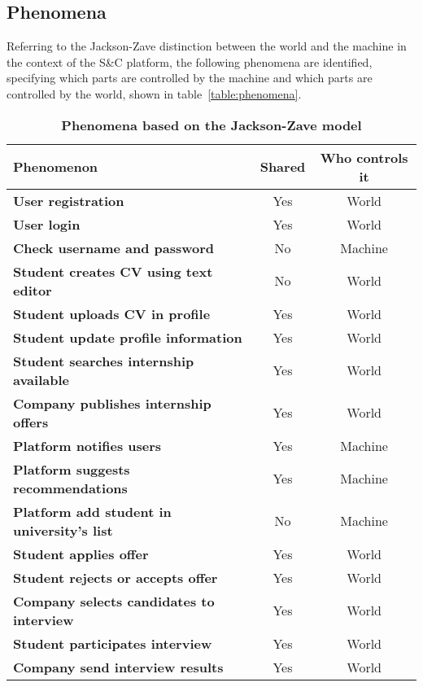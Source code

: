 \subsection{Phenomena}
Referring to the Jackson-Zave distinction between the world and the machine in the context of the S\&C platform, the following phenomena are 
identified, specifying which parts are controlled by the machine and which parts are controlled by the world, shown in table~\ref{table:phenomena}.

\begin{table}[H]
    \caption*{\textbf{Phenomena based on the Jackson-Zave model}}
    \centering 
    \begin{tabular}{|p{20em}|c|c|}
    \hline
    \rowcolor{bluepoli!40} %
    \textbf{Phenomenon} & \textbf{Shared} & \textbf{Who controls it} \T\B \\
    \hline
    \textbf{User registration} & Yes & World \T\B \\
    \textbf{User login} & Yes & World \T\B\\
    \textbf{Check username and password} & No & Machine \T\B\\
    \textbf{Student creates CV using text editor} & No & World  \T\B \\
    \textbf{Student uploads CV in profile} & Yes & World  \T\B \\
    \textbf{Student update profile information} & Yes & World  \T\B \\
    \textbf{Student searches internship available} & Yes & World \T\B\\
    \textbf{Company publishes internship offers} & Yes & World \T\B \\
    \textbf{Platform notifies users} & Yes & Machine \B\\
    \textbf{Platform suggests recommendations} & Yes & Machine \T\B \\
    \textbf{Platform add student in university's list} & No & Machine \T\B \\
    \textbf{Student applies offer} & Yes & World \B\\
    \textbf{Student rejects or accepts offer} & Yes & World \T\B \\
    \textbf{Company selects candidates to interview} & Yes & World \T\B\\
    \textbf{Student participates interview} & Yes & World \T\B \\
    \textbf{Company send interview results} & Yes & World \B\\

\end{tabular}
\end{table}
